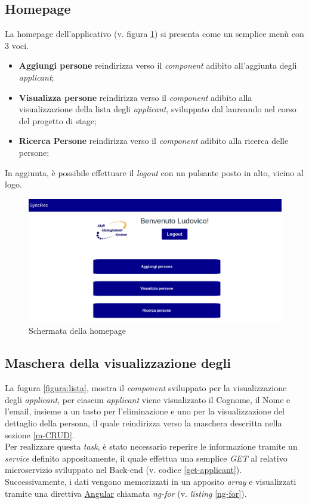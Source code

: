 \subsection{Homepage}
La homepage dell'applicativo (v. figura \ref{figura:homepage}) si presenta come un semplice menù con 3 voci.
\begin{itemize}
	\item \textbf{Aggiungi persone} reindirizza verso il \textit{component} adibito all'aggiunta degli \textit{applicant};
	\item \textbf{Visualizza persone} reindirizza verso il \textit{component} adibito alla visualizzazione della lista degli \textit{applicant}, sviluppato dal laureando nel corso del progetto di stage;
	\item \textbf{Ricerca Persone} reindirizza verso il \textit{component} adibito alla ricerca delle persone;
\end{itemize}
In aggiunta, è possibile effettuare il \textit{logout} con un pulsante posto in alto, vicino al logo.
\vspace{0.5em}
\begin{figure}[!h] 
	\centering 
	\includegraphics[width=1\columnwidth]{immagini/svil/homepage} 
	\caption{Schermata della homepage}
	\label{figura:homepage}
\end{figure}

\subsection{Maschera della visualizzazione degli\applicant} \label{section: applicant-list}
La fugura \ref{figura:lista}, mostra il \textit{component} sviluppato per la visualizzazione degli \textit{applicant}, per ciascun \textit{applicant} viene visualizzato il Cognome, il Nome e l'email, insieme a un tasto per l'eliminazione e uno per la visualizzazione del dettaglio della persona, il quale reindirizza verso la maschera descritta nella sezione \ref{m-CRUD}.\\
Per realizzare questa \textit{task}, è stato necessario reperire le informazione tramite un \textit{service} definito appositamente, il quale effettua una semplice \textit{GET} al relativo microservizio sviluppato nel \gls{Back-end} (v. codice \ref{get-applicant}).
Successivamente, i dati vengono memorizzati in un apposito \textit{array} e visualizzati tramite una direttiva \hyperref[angular]{Angular} chiamata \textit{ng-for} (v. \textit{listing}  \ref{ng-for}).

